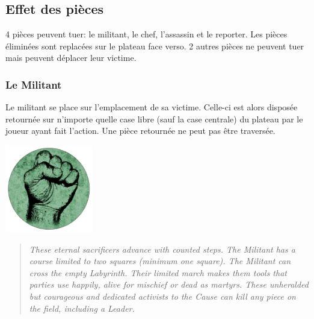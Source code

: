 \documentclass{article}
\begin{document}
\newpage

\subsection{Effet des pièces}
4 pièces peuvent tuer: le militant, le chef, l'assassin et le reporter. Les pièces éliminées sont replacées sur le plateau face verso.
2 autres pièces ne peuvent tuer mais peuvent déplacer leur victime.
\vspace{20pt} %


\subsubsection{Le Militant}
Le militant se place sur l'emplacement de sa victime. Celle-ci est alors disposée retournée sur n'importe quelle case libre (sauf la case centrale) du plateau 
par le joueur ayant fait l'action. Une pièce retournée ne peut pas être traversée.


\vspace{10pt} %
\noindent %
\begin{minipage}{0.3\textwidth} %
\includegraphics[width=1.5in,height=1.5in]{media/image10.png}
\end{minipage}%
\hfill %
\begin{minipage}{0.75\textwidth} %

\begin{quote}
\textit{These eternal sacrificers advance with counted steps. The Militant has a
course limited to two squares (minimum one square). The Militant can
cross the empty Labyrinth. Their limited march makes them tools that
parties use happily, alive for mischief or dead as martyrs.
These unheralded but courageous and dedicated activists to the Cause can
kill any piece on the field, including a Leader.}
\end{quote}
\end{minipage}
\vspace{20pt} %
\end{document}
